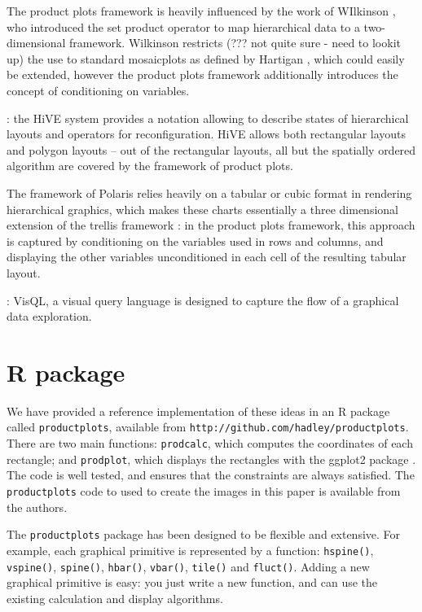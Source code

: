 \documentclass[journal]{vgtc}
\begin{document}
The product plots framework is heavily influenced by the work of WIlkinson \citep{wilkinson:1999, wilkinson:2005}, who introduced the set product operator to map hierarchical data to a two-dimensional framework.  Wilkinson restricts (??? not quite sure - need to lookit up) the use to standard mosaicplots as defined by Hartigan \citep{hartigan:1981}, which could easily be extended, however the product plots framework additionally introduces the concept of conditioning on variables.

 \citep{slingsby:2009}: the HiVE system provides a notation allowing to describe states of hierarchical layouts and operators for reconfiguration. HiVE allows both rectangular layouts and polygon layouts -- out of the rectangular layouts, all but the spatially ordered algorithm are covered by the  framework of product plots.
 
The framework of  Polaris  \cite{stolte:2002} relies heavily on a tabular or cubic format in rendering hierarchical graphics, which makes these charts essentially a three dimensional extension of the trellis framework \citep{cleveland:1994,becker:1996}:  in the product plots framework, this approach is captured by conditioning on the variables used in rows and columns, and displaying the other variables unconditioned in each cell of the resulting tabular layout.

 \cite{mackinlay:1986,mackinlay:2007}: VisQL, a visual query language is designed to capture the flow of a graphical data exploration. 
 

\section{R package}
\label{sec:package}

We have provided a reference implementation of these ideas in an R \citep{R} package called {\tt productplots}, available from {\tt http://github.com/hadley/productplots}. There are two main functions: {\tt prodcalc}, which computes the coordinates of each rectangle; and {\tt prodplot}, which displays the rectangles with the ggplot2 package \citep{me:ggplot2}. The code is well tested, and ensures that the constraints are always satisfied. The {\tt productplots} code to used to create the images in this paper is available from the authors.

The {\tt productplots} package has been designed to be flexible and extensive.  For example, each graphical primitive is represented by a function: {\tt hspine()}, {\tt vspine()}, {\tt spine()}, {\tt hbar()}, {\tt vbar()}, {\tt tile()} and {\tt fluct()}. Adding a new graphical primitive is easy: you just write a new function, and can use the existing calculation and display algorithms.
\end{document}
